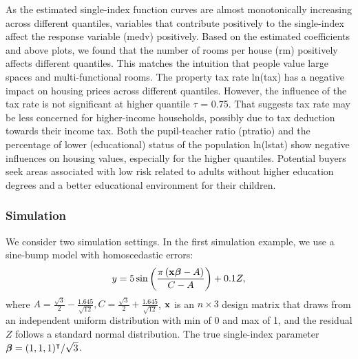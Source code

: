 \begin{Schunk}
\end{Schunk}

As the estimated single-index function curves are almost monotonically increasing across different quantiles, variables that contribute positively to the single-index affect the response variable (medv) positively. Based on the estimated coefficients and above plots, we found that the number of rooms per house (rm) positively affects different quantiles. This matches the intuition that people value large spaces and multi-functional rooms. The property tax rate ln(tax) has a negative impact on housing prices across different quantiles. However, the influence of the tax rate is not significant at higher quantile $\tau$ = 0.75. That suggests tax rate may be less concerned for higher-income households, possibly due to tax deduction towards their income tax. Both the pupil-teacher ratio (ptratio) and the percentage of lower (educational) status of the population ln(lstat) show negative influences on housing values, especially for the higher quantiles. Potential buyers seek areas associated with low risk related to adults without higher education degrees and a better educational environment for their children. 

\subsubsection{Simulation}

We consider two simulation settings. In the first simulation example, we use a sine-bump model with homoscedastic errors:
\begin{equation} \label{eq:sim1}
	y=5 \sin \left(\frac{\pi \left( {\bf x}\mbox{\boldmath$\beta$} - A \right)}{C-A} \right)+ 0.1 Z, 
\end{equation}
where $A=\frac{\sqrt{3}}{2}-\frac{1.645}{\sqrt{12}}, C=\frac{\sqrt{3}}{2}+\frac{1.645}{\sqrt{12}}$,  ${\bf x}$ is an $n\times3$ design matrix that draws from an independent uniform distribution with min of 0 and max of 1, and the residual $Z$ follows a standard normal distribution. The true single-index parameter $\mbox{\boldmath$\beta$} = (1,1,1)^{\intercal} / \sqrt{3}$.


